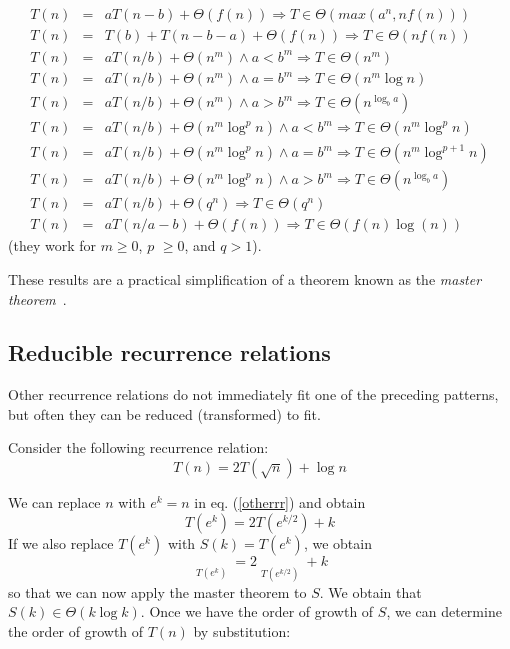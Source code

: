 \documentclass[justified, sixbynine]{tufte-book}
\def\stackunder#1#2{\mathrel{\mathop{#2}\limits_{#1}}}
\theoremstyle{plain}%
\newtheorem * {corollary}{Corollary}
\theoremstyle{definition}
\theoremstyle{remark}
\newtheorem * {remark}{Remark}
\newtheorem * {note}{Note}
\begin{document}
\begin{fullwidth}
\begin{eqnarray}
T(n) \!\!\!\!\!&=&\!\!\!\!\!aT(n-b)+\Theta (f(n))\Rightarrow T\!\in\! \Theta (max(a^n, nf(n))) \\
T(n) \!\!\!\!\!&=&\!\!\!\!\!T(b)+T(n-b-a)+\Theta(f(n))\Rightarrow T\!\in\! \Theta (nf(n)) \\
T(n) \!\!\!\!\!&=&\!\!\!\!\!aT(n/b)+\Theta (n^m)\land a<b^m\Rightarrow T\!\in\! \Theta (n^m) \\
T(n) \!\!\!\!\!&=&\!\!\!\!\!aT(n/b)+\Theta (n^m)\land a=b^m\Rightarrow T\!\in\! \Theta
(n^m\log n) \\
T(n) \!\!\!\!\!&=&\!\!\!\!\!aT(n/b)+\Theta (n^m)\land a>b^m\Rightarrow T\!\in\! \Theta
(n^{\log _ba}) \\
T(n) \!\!\!\!\!&=&\!\!\!\!\!aT(n/b)+\Theta (n^m\log ^pn)\land a<b^m\Rightarrow T\!\in\!
\Theta (n^m\log ^pn) \\
T(n) \!\!\!\!\!&=&\!\!\!\!\!aT(n/b)+\Theta (n^m\log ^pn)\land a=b^m\Rightarrow T\!\in\!
\Theta (n^m\log ^{p+1}n) \\
T(n) \!\!\!\!\!&=&\!\!\!\!\!aT(n/b)+\Theta (n^m\log ^pn)\land a>b^m\Rightarrow T\!\in\!
\Theta (n^{\log _ba}) \\
T(n) \!\!\!\!\!&=&\!\!\!\!\!aT(n/b)+\Theta (q^n)\Rightarrow T\!\in\! \Theta (q^n) \\
T(n) \!\!\!\!\!&=&\!\!\!\!\!aT(n/a-b)+\Theta (f(n)) \Rightarrow T\!\in\! \Theta (f(n)\log(n))
\end{eqnarray}
(they work for $m\geq 0$, $p$ $\geq 0$, and $q>1$).


These results are a practical simplification of a theorem known as the {\it master theorem}~\cite{mastertheorem}.

\goodbreak\subsection{Reducible recurrence relations}

Other recurrence relations do not immediately fit one of the preceding patterns, but often they can be reduced (transformed) to fit.

Consider the following recurrence relation:
\begin{equation}
T(n)=
2T(\sqrt{n})+\log n
\label{otherrr}
\end{equation}

We can replace $n$ with $e^k=n$ in eq. (\ref{otherrr}) and obtain
\begin{equation}
T(e^k)=
2T(e^{k/2})+k
\end{equation}
If we also replace $T(e^k)$ with $S(k)=T(e^k)$, we obtain
\begin{equation}
\stackunder{T(e^k)}{\underbrace{S(k)}}=
2\stackunder{T(e^{k/2})}{\underbrace{S(k/2)}}+k
\end{equation}
so that we can now apply the master theorem to $S$. We obtain that $S(k)\in
\Theta (k\log k)$. Once we have the order of growth of $S$, we can determine
the order of growth of $T(n)$ by substitution:


\end{fullwidth}
\end{document}
